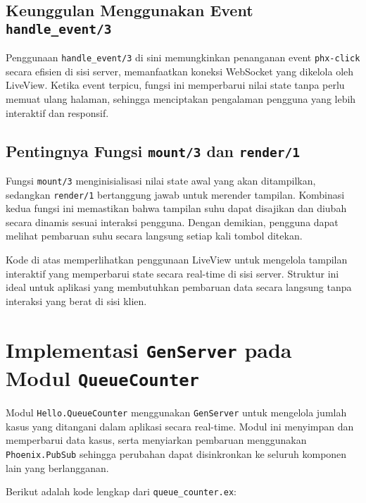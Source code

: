 \subsection{Keunggulan Menggunakan Event \texttt{handle\_event/3}}
Penggunaan \texttt{handle\_event/3} di sini memungkinkan penanganan event \texttt{phx-click} secara efisien di sisi server, memanfaatkan koneksi WebSocket yang dikelola oleh LiveView. Ketika event terpicu, fungsi ini memperbarui nilai state tanpa perlu memuat ulang halaman, sehingga menciptakan pengalaman pengguna yang lebih interaktif dan responsif.

\subsection{Pentingnya Fungsi \texttt{mount/3} dan \texttt{render/1}}
Fungsi \texttt{mount/3} menginisialisasi nilai state awal yang akan ditampilkan, sedangkan \texttt{render/1} bertanggung jawab untuk merender tampilan. Kombinasi kedua fungsi ini memastikan bahwa tampilan suhu dapat disajikan dan diubah secara dinamis sesuai interaksi pengguna. Dengan demikian, pengguna dapat melihat pembaruan suhu secara langsung setiap kali tombol ditekan.

Kode di atas memperlihatkan penggunaan LiveView untuk mengelola tampilan interaktif yang memperbarui state secara real-time di sisi server. Struktur ini ideal untuk aplikasi yang membutuhkan pembaruan data secara langsung tanpa interaksi yang berat di sisi klien.

\section{Implementasi \texttt{GenServer} pada Modul \texttt{QueueCounter}}

Modul \texttt{Hello.QueueCounter} menggunakan \texttt{GenServer} untuk mengelola jumlah kasus yang ditangani dalam aplikasi secara real-time. Modul ini menyimpan dan memperbarui data kasus, serta menyiarkan pembaruan menggunakan \texttt{Phoenix.PubSub} sehingga perubahan dapat disinkronkan ke seluruh komponen lain yang berlangganan.

Berikut adalah kode lengkap dari \texttt{queue\_counter.ex}:

